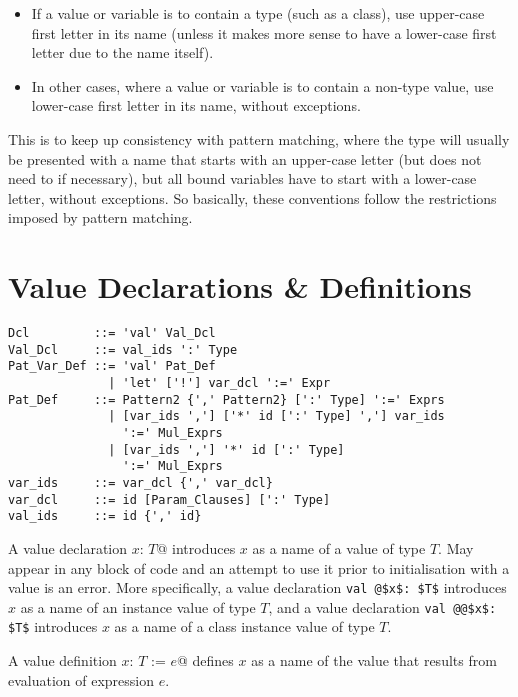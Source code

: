\begin{itemize}
  \item If a value or variable is to contain a type (such as a class), use upper-case first letter in its name (unless it makes more sense to have a lower-case first letter due to the name itself). 
  \item In other cases, where a value or variable is to contain a non-type value, use lower-case first letter in its name, without exceptions. 
\end{itemize}

This is to keep up consistency with pattern matching, where the type will usually be presented with a name that starts with an upper-case letter (but does not need to if necessary), but all bound variables have to start with a lower-case letter, without exceptions. So basically, these conventions follow the restrictions imposed by pattern matching. 





\section{Value Declarations \& Definitions}
\label{sec:value-dcl-def}

\syntax\begin{lstlisting}
Dcl         ::= 'val' Val_Dcl
Val_Dcl     ::= val_ids ':' Type
Pat_Var_Def ::= 'val' Pat_Def
              | 'let' ['!'] var_dcl ':=' Expr
Pat_Def     ::= Pattern2 {',' Pattern2} [':' Type] ':=' Exprs
              | [var_ids ','] ['*' id [':' Type] ','] var_ids 
                ':=' Mul_Exprs
              | [var_ids ','] '*' id [':' Type] 
                ':=' Mul_Exprs
var_ids     ::= var_dcl {',' var_dcl}
var_dcl     ::= id [Param_Clauses] [':' Type]
val_ids     ::= id {',' id}
\end{lstlisting}

A value declaration \lstinline@val $x$: $T$@ introduces $x$ as a name of a value of type $T$. May appear in any block of code and an attempt to use it prior to initialisation with a value is an error. More specifically, a value declaration \lstinline+val @$x$: $T$+ introduces $x$ as a name of an instance value of type $T$, and a value declaration \lstinline+val @@$x$: $T$+ introduces $x$ as a name of a class instance value of type $T$. 

A value definition \lstinline@val $x$: $T$ := $e$@ defines $x$ as a name of the value that results from evaluation of expression $e$.

